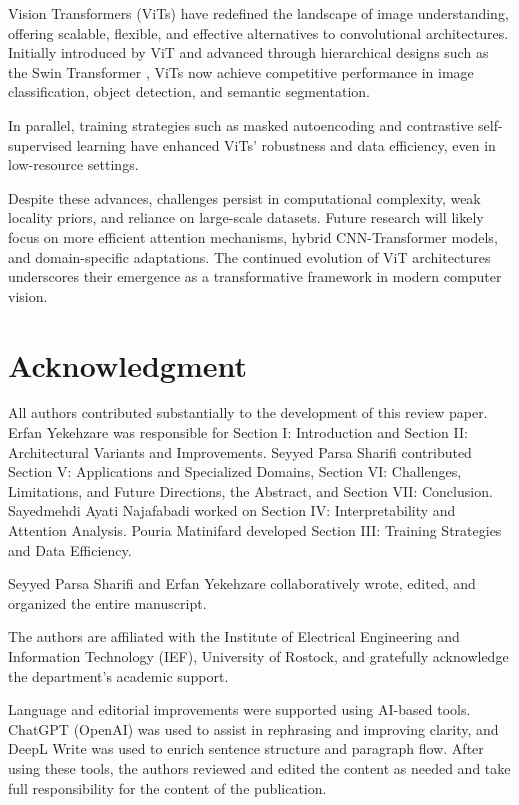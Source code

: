\documentclass[conference]{IEEEtran}
\begin{document}
Vision Transformers (ViTs) have redefined the landscape of image understanding, offering scalable, flexible, and effective alternatives to convolutional architectures. Initially introduced by ViT \cite{dosovitskiy2021an} and advanced through hierarchical designs such as the Swin Transformer \cite{liu2021swin}, ViTs now achieve competitive performance in image classification, object detection, and semantic segmentation. 

In parallel, training strategies such as masked autoencoding \cite{he2022masked} and contrastive self-supervised learning \cite{caron2021emerging} have enhanced ViTs' robustness and data efficiency, even in low-resource settings.

Despite these advances, challenges persist in computational complexity, weak locality priors, and reliance on large-scale datasets. Future research will likely focus on more efficient attention mechanisms, hybrid CNN-Transformer models, and domain-specific adaptations. The continued evolution of ViT architectures underscores their emergence as a transformative framework in modern computer vision.



\section*{Acknowledgment}
All authors contributed substantially to the development of this review paper. Erfan Yekehzare was responsible for Section I: Introduction and Section II: Architectural Variants and Improvements. Seyyed Parsa Sharifi contributed Section V: Applications and Specialized Domains, Section VI: Challenges, Limitations, and Future Directions, the Abstract, and Section VII: Conclusion. Sayedmehdi Ayati Najafabadi worked on Section IV: Interpretability and Attention Analysis. Pouria Matinifard developed Section III: Training Strategies and Data Efficiency. 

Seyyed Parsa Sharifi and Erfan Yekehzare collaboratively wrote, edited, and organized the entire manuscript.

The authors are affiliated with the Institute of Electrical Engineering and Information Technology (IEF), University of Rostock, and gratefully acknowledge the department’s academic support.

Language and editorial improvements were supported using AI-based tools. ChatGPT (OpenAI) was used to assist in rephrasing and improving clarity, and DeepL Write was used to enrich sentence structure and paragraph flow. After using these tools, the authors reviewed and edited the content as needed and take full responsibility for the content of the publication.





\end{document}
